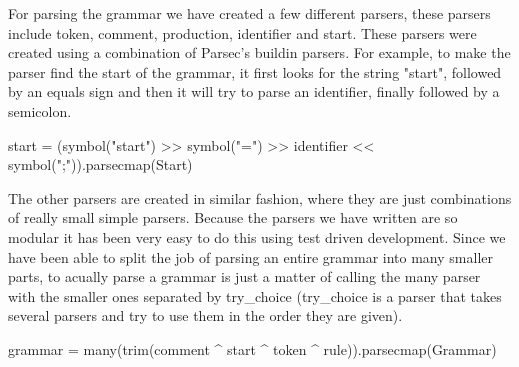 For parsing the grammar we have created a few different parsers, these parsers include token, comment, production, identifier and start. These parsers were created using a combination of Parsec's buildin parsers. For example, to make the parser find the start of the grammar, it first looks for the string "start", followed by an equals sign and then it will try to parse an identifier, finally followed by a semicolon.
\begin{python}
start = (symbol("start") >> symbol("=") >> identifier
    << symbol(";")).parsecmap(Start)
\end{python}
The other parsers are created in similar fashion, where they are just combinations of really small simple parsers. Because the parsers we have written are so modular it has been very easy to do this using test driven development. Since we have been able to split the job of parsing an entire grammar into many smaller parts, to acually parse a grammar is just a matter of calling the many parser with the smaller ones separated by try\_choice (try\_choice is a parser that takes several parsers and try to use them in the order they are given).
\begin{python}
grammar = many(trim(comment ^ start ^ token ^ rule)).parsecmap(Grammar)
\end{python}

